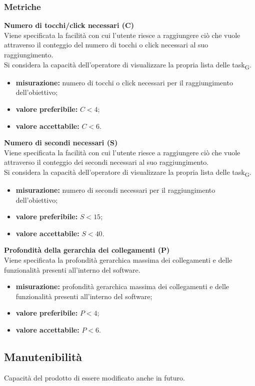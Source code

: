 \subsubsection{Metriche}
\textbf{Numero di tocchi/click necessari (C)}\\
Viene specificata la facilità con cui l'utente riesce a raggiungere ciò che vuole attraverso il conteggio del numero di tocchi o click necessari al suo raggiungimento.\\
Si considera la capacità dell'operatore di visualizzare la propria lista delle task\textsubscript{G}.
\begin{itemize}
	\item \textbf{misurazione:} numero di tocchi o click necessari per il raggiungimento dell'obiettivo;
	\item \textbf{valore preferibile:} $C < 4$;
	\item \textbf{valore accettabile:} $C < 6$.
\end{itemize}
\textbf{Numero di secondi necessari (S)}\\
Viene specificata la facilità con cui l'utente riesce a raggiungere ciò che vuole attraverso il conteggio dei secondi necessari al suo raggiungimento.\\
Si considera la capacità dell'operatore di visualizzare la propria lista delle task\textsubscript{G}.
\begin{itemize}
	\item \textbf{misurazione:} numero di secondi necessari per il raggiungimento dell'obiettivo;
	\item \textbf{valore preferibile:} $S < 15$;
	\item \textbf{valore accettabile:} $S < 40$.
\end{itemize}
\textbf{Profondità della gerarchia dei collegamenti (P)}\\
Viene specificata la profondità gerarchica massima dei collegamenti e delle funzionalità presenti all'interno del software.
\begin{itemize}
	\item \textbf{misurazione:} profondità gerarchica massima dei collegamenti e delle funzionalità presenti all'interno del software;
	\item \textbf{valore preferibile:} $P < 4$;
	\item \textbf{valore accettabile:} $P < 6$.
\end{itemize}
\subsection{Manutenibilità}
Capacità del prodotto di essere modificato anche in futuro.

